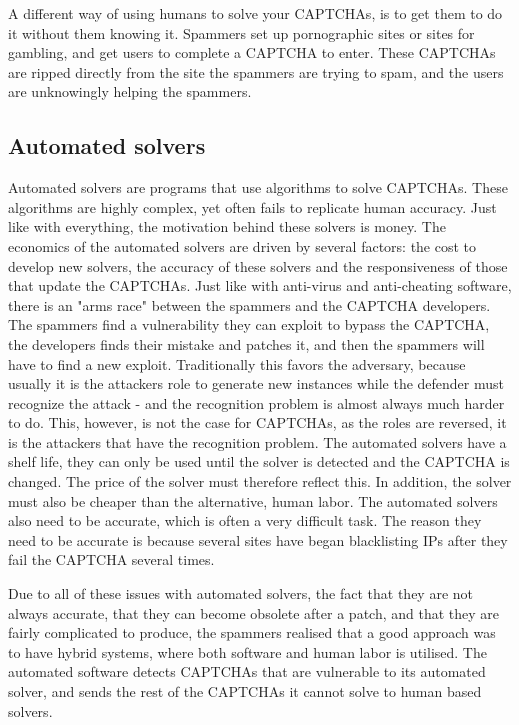 \documentclass[a4paper]{IEEEtran}
\begin{document}
A different way of using humans to solve your CAPTCHAs, is to get them to do it without them knowing it. Spammers set up pornographic sites or sites for gambling, and get users to complete a CAPTCHA to enter. These CAPTCHAs are ripped directly from the site the spammers are trying to spam, and the users are unknowingly helping the spammers\cite{porn}.

\subsection{Automated solvers}
Automated solvers are programs that use algorithms to solve CAPTCHAs. These algorithms are highly complex, yet often fails to replicate human accuracy. Just like with everything, the motivation behind these solvers is money. The economics of the automated solvers are driven by several factors: the cost to develop new solvers, the accuracy of these solvers and the responsiveness of those that update the CAPTCHAs. Just like with anti-virus and anti-cheating software, there is an "arms race" between the spammers and the CAPTCHA developers. The spammers find a vulnerability they can exploit to bypass the CAPTCHA, the developers finds their mistake and patches it, and then the spammers will have to find a new exploit. Traditionally this favors the adversary, because usually it is the attackers role to generate new instances while the defender must recognize the attack - and the recognition problem is almost always much harder to do. This, however, is not the case for CAPTCHAs, as the roles are reversed, it is the attackers that have the recognition problem. The automated solvers have a shelf life, they can only be used until the solver is detected and the CAPTCHA is changed. The price of the solver must therefore reflect this. In addition, the solver must also be cheaper than the alternative, human labor. The automated solvers also need to be accurate, which is often a very difficult task. The reason they need to be accurate is because several sites have began blacklisting IPs after they fail the CAPTCHA several times. 

Due to all of these issues with automated solvers, the fact that they are not always accurate, that they can become obsolete after a patch, and that they are fairly complicated to produce, the spammers realised that a good approach was to have hybrid systems, where both software and human labor is utilised. The automated software detects CAPTCHAs that are vulnerable to its automated solver, and sends the rest of the CAPTCHAs it cannot solve to human based solvers. 
\end{document}
